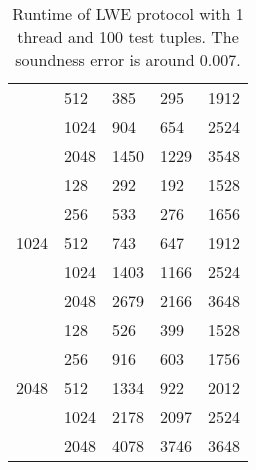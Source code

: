 \begin{table}[h!]
\begin{tabular}{|c|m{4em}|m{4em}|m{4em}|m{7em}|}
                                            & 512  & 385                  & 295                    & 1912                                         \\ \cline{2-5} 
                                            & 1024 & 904                  & 654                    & 2524                                         \\ \cline{2-5} 
                                            & 2048 & 1450                 & 1229                   & 3548                                         \\ \hline
\multicolumn{1}{|l|}{\multirow{5}{*}{1024}} & 128  & 292                  & 192                    & 1528                                         \\ \cline{2-5} 
\multicolumn{1}{|l|}{}                      & 256  & 533                  & 276                    & 1656                                         \\ \cline{2-5} 
\multicolumn{1}{|l|}{}                      & 512  & 743                  & 647                    & 1912                                         \\ \cline{2-5} 
\multicolumn{1}{|l|}{}                      & 1024 & 1403                 & 1166                   & 2524                                         \\ \cline{2-5} 
\multicolumn{1}{|l|}{}                      & 2048 & 2679                 & 2166                   & 3648                                         \\ \hline
\multicolumn{1}{|l|}{\multirow{5}{*}{2048}} & 128  & 526                  & 399                    & 1528                                         \\ \cline{2-5} 
\multicolumn{1}{|l|}{}                      & 256  & 916                  & 603                    & 1756                                         \\ \cline{2-5} 
\multicolumn{1}{|l|}{}                      & 512  & 1334                 & 922                    & 2012                                         \\ \cline{2-5} 
\multicolumn{1}{|l|}{}                      & 1024 & 2178                 & 2097                   & 2524                                         \\ \cline{2-5} 
\multicolumn{1}{|l|}{}                      & 2048 & 4078                 & 3746                   & 3648                                         \\ \hline
\end{tabular}
\caption{Runtime of LWE protocol with 1 thread and 100 test tuples. The soundness error is around 0.007.}
\label{table:benchmark-lwe}
\end{table}